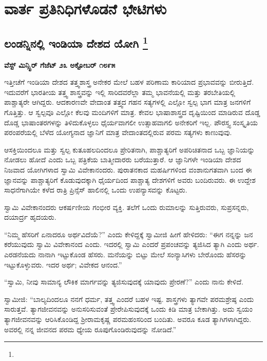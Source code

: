 

\part{ವಾರ್ತ ಪ್ರತಿನಿಧಿಗಳೊಡನೆ ಭೇಟಿಗಳು}

\chapter[ಲಂಡನ್ನಿನಲ್ಲಿ ಇಂಡಿಯಾ ದೇಶದ ಯೋಗಿ ]{ಲಂಡನ್ನಿನಲ್ಲಿ ಇಂಡಿಯಾ ದೇಶದ ಯೋಗಿ \protect\footnote{}}

\centerline{\textbf{ವೆಸ್ಟ್ ಮಿನ್ಸ್ಟಿರ್​ ಗೆಜೆಟ್​ ೨೩ ಅಕ್ಟೋಬರ್​ ೧೮೯೫}}

ಇತ್ತೀಚೆಗೆ ಇಂಡಿಯಾ ದೇಶದ ತತ್ತ್ವಶಾಸ್ತ್ರ ಅನೇಕರ ಮೇಲೆ ಬಹಳ ಪರಿಣಾಮ ಕಾರಿಯಾದ ಪ್ರಭಾವವನ್ನು ಬೀರುತ್ತಿದೆ. ಇದುವರೆಗೆ ಭಾರತೀಯ ತತ್ತ್ವ ಶಾಸ್ತ್ರವನ್ನು ಇಲ್ಲಿ ಸಾರಿದವರೆಲ್ಲಾ ತಮ್ಮ ಭಾವನೆಯಲ್ಲಿ ಮತ್ತು ತರಬೇತಿಯಲ್ಲಿ ಪಾಶ್ಚಾತ್ಯರೇ ಆಗಿದ್ದರು. ಆದಕಾರಣವೇ ವೇದಾಂತ ತತ್ತ್ವದ ಗಹನ ಸತ್ಯಗಳಲ್ಲಿ ಎಲ್ಲೋ ಸ್ವಲ್ಪ ಭಾಗ ಮಾತ್ರ ಜನಗಳಿಗೆ ಗೊತ್ತಿತ್ತು. ಆ ಸ್ವಲ್ಪವೂ ಎಲ್ಲೋ ಕೆಲವು ಮಂದಿಗಳಿಗೆ ಮಾತ್ರ. ಕೇವಲ ಭಾಷಾಶಾಸ್ತ್ರದ ದೃಷ್ಟಿಯಿಂದ ಮಾಡಿರುವ ದೊಡ್ಡ ದೊಡ್ಡ ಭಾಷಾಂತರಗಳನ್ನು ತಿಳಿದುಕೊಳ್ಳಲು ಧೈರ್ಯವಾಗಲೀ ಉತ್ಸಾಹವಾಗಲಿ ಅನೇಕರಿಗೆ ಇಲ್ಲ. ಪೌರಸ್ತ್ಯ ಸಂಸ್ಕೃತಿಯ ಪರಂಪರೆಯಲ್ಲಿ ಬೆಳೆದ ಯೋಗ್ಯನಾದ ಜ್ಞಾನಿಗೆ ಮಾತ್ರ ವೇದಾಂತದಲ್ಲಿರುವ ಪರಮ ಸತ್ಯಗಳು ಕಾಣುವುವು.

ಆಸಕ್ತಿಯಿಂದಲೂ ಮತ್ತು ಸ್ವಲ್ಪ ಕುತೂಹಲದಿಂದಲೂ ಪ್ರೇರಿತನಾಗಿ, ಪಾಶ್ಚಾತ್ಯರಿಗೆ ಅಪರಿಚಿತನಾದ ಒಬ್ಬ ಜ್ಞಾನಿಯನ್ನು ನೋಡಲು ಹೋದೆ ಎಂದು ಒಬ್ಬ ಪತ್ರಿಕೆಯ ಬಾತ್ಮೀದಾರರು ಬರೆಯುತ್ತಾರೆ. ಆ ಜ್ಞಾನಿಗಳೇ ಇಂಡಿಯಾ ದೇಶದ ನಿಜವಾದ ಯೋಗಿಗಳಾದ ಸ್ವಾಮಿ ವಿವೇಕಾನಂದರು. ಪುರಾತನಕಾದ ಮಹರ್ಷಿಗಳಿಂದ ವಂಶಾನುಗತವಾಗಿ ಬಂದ ಈ ಜ್ಞಾನವನ್ನು ಪಾಶ್ಚಾತ್ಯರಿಗೆ ಕೊಡುವುದಕ್ಕಾಗಿ ಧೈರ್ಯದಿಂದ ಪಾಶ್ಚಾತ್ಯ ದೇಶಗಳಿಗೆ ಅವರು ಬಂದಿರುವರು. ಈ ಉದ್ದೇಶ ಸಾಧನೆಗಾಗಿಯೇ ಕಳೆದ ರಾತ್ರಿ ಪ್ರಿನ್ಸೆಸ್​ ಹಾಲಿನಲ್ಲಿ ಒಂದು ಉಪನ್ಯಾಸವನ್ನು ಕೊಟ್ಟರು.

ಸ್ವಾಮಿ ವಿವೇಕಾನಂದರು ಆಕರ್ಷಣೀಯ ಗಂಭೀರ ವ್ಯಕ್ತಿ. ತಲೆಗೆ ಒಂದು ರುಮಾಲನ್ನು ಸುತ್ತಿರುವರು, ಸುಪ್ರಸನ್ನರು, ದಯಾರ್ದ್ರ ಹೃದಯರು.

“ನಿಮ್ಮ ಹೆಸರಿಗೆ ಏನಾದರೂ ಅರ್ಥವಿದೆಯೆ?” ಎಂದು ಕೇಳಿದ್ದಕ್ಕೆ ಸ್ವಾಮೀಜಿ ಹೀಗೆ ಹೇಳಿದರು: “ಈಗ ನನ್ನನ್ನು ಜನ ಕರೆಯುವುದು ಸ್ವಾಮಿ ವಿವೇಕಾನಂದ ಎಂದು. ಇದರಲ್ಲಿ ಸ್ವಾಮಿ ಎಂದರೆ ಪ್ರಪಂಚವನ್ನು ತ್ಯಜಿಸಿದ ತ್ಯಾಗಿ ಎಂದು ಅರ್ಥ. ಎರಡನೆಯದು ನಾನಾಗಿ ಇಟ್ಟುಕೊಂಡ ಹೆಸರು. ಮನೆಯನ್ನು ಬಿಟ್ಟು ಮೇಲೆ ಸಂನ್ಯಾಸಿಗಳು ಬೇರೊಂದು ಹೆಸರನ್ನು ಇಟ್ಟುಕೊಳ್ಳುವರು. ಇದರ ಅರ್ಥ; ವಿವೇಕದ ಆನಂದ.”

“ಸ್ವಾಮಿ, ನೀವು ಸಾಮಾನ್ಯ ಲೌಕಿಕ ಮಾರ್ಗವನ್ನು ತ್ಯಜಿಸುವುದಕ್ಕೆ ಯಾವುದು ಪ್ರೇರಣೆ?” ಎಂದು ನಾನು ಕೇಳಿದೆ.

ಸ್ವಾಮೀಜಿ: “ಬಾಲ್ಯದಿಂದಲೂ ನನಗೆ ಧರ್ಮ, ತತ್ತ್ವ ಎಂದರೆ ಬಹಳ ಇಷ್ಟ. ಶಾಸ್ತ್ರಗಳು ತ್ಯಾಗವೇ ಪರಮಶ್ರೇಷ್ಠ ಎಂದು ಸಾರುತ್ತವೆ. ತ್ಯಾಗಜೀವನವನ್ನು ಅನುಸರಿಸುವಂತೆ ಪ್ರೇರೇಪಿಸುವುದಕ್ಕೆ ಒಂದು ಕಿಡಿ ಮಾತ್ರ ಬೇಕಾಗಿತ್ತು. ಅದು ಸ್ವಯಂ ತ್ಯಾಗಜೀವನವನ್ನು ಆರಿಸಿಕೊಂಡಿದ್ದ ಶ‍್ರೀರಾಮಕೃಷ್ಣ ಪರಮಹಂಸರಿಂದ ಬಂದಿತು. ಅವರೂ ಕೂಡ ತ್ಯಾಗಿಗಳಾಗಿದ್ದರು. ಅವರಲ್ಲಿ ನನ್ನ ಜೀವನದ ಪರಮ ಧ್ಯೇಯ ರೂಪುಗೊಂಡಿರುವುದನ್ನು ನೋಡಿದೆ.”

